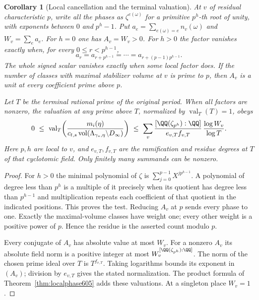 \documentclass[a4paper,11pt]{article}
\newtheorem{corollary}[proposition]{Corollary}
\theoremstyle{definition}
\theoremstyle{remark}
\numberwithin{equation}{section}
\begin{document}
\begin{corollary}[Local cancellation and the terminal valuation]
\leavevmode\label{cor:phasevaluation605}
At \(v\) of residual characteristic \(p\), write all the
phases as \(\zeta^{e(\omega)}\) for a primitive \(p^h\)-th
root of unity, with exponents between \(0\) and \(p^h-1\).
Put \(a_e=\sum_{e(\omega)=e}n_v(\omega)\) and
\(W_v=\sum_e a_e\). For \(h=0\) one has \(A_v=W_v>0\).
For \(h>0\) the factor vanishes exactly when, for every
\(0\le r<p^{h-1}\),
\[
        a_r=a_{r+p^{h-1}}=\cdots=a_{r+(p-1)p^{h-1}} .
\]
The whole signed scalar vanishes exactly when some local
factor does. If the number of classes with maximal stabilizer
volume at \(v\) is prime to \(p\), then \(A_v\) is a unit
at every coefficient prime above \(p\).

Let \(T\) be the terminal rational prime of the original
period. When all factors are nonzero, the valuation at any
prime above \(T\), normalized by \(\operatorname{val}_T(T)=1\),
obeys
\[
 0\ \le\
 \operatorname{val}_T\!\left(
   \frac{m_i(\eta)}
        {c_{t,s}\operatorname{vol}(\Lambda_{\gamma_*,\eta}\backslash D_\infty)}
                         \right)
 \ \le\ \sum_v
   \frac{[\QQ(\zeta_{p^h}):\QQ]}{e_{v,T}f_{v,T}}\,
                       \frac{\log W_v}{\log T}.
\]
Here \(p,h\) are local to \(v\), and \(e_{v,T},f_{v,T}\)
are the ramification and residue degrees at \(T\) of that
cyclotomic field. Only finitely many summands can be nonzero.
\end{corollary}
\begin{proof}
For \(h>0\) the minimal polynomial of \(\zeta\) is
\(\sum_{j=0}^{p-1} X^{jp^{h-1}}\). A polynomial of degree
less than \(p^h\) is a multiple of it precisely when its
quotient has degree less than \(p^{h-1}\) and multiplication
repeats each coefficient of that quotient in the indicated
positions. This proves the test. Reducing \(A_v\) at \(p\)
sends every phase to one. Exactly the maximal-volume classes
have weight one; every other weight is a positive power of
\(p\). Hence the residue is the asserted count modulo \(p\).

Every conjugate of \(A_v\) has absolute value at most \(W_v\).
For a nonzero \(A_v\) its absolute field norm is a positive
integer at most \(W_v^{[\QQ(\zeta_{p^h}):\QQ]}\). The norm
of the chosen prime ideal over \(T\) is \(T^{f_{v,T}}\).
Taking logarithms bounds its exponent in \((A_v)\); division
by \(e_{v,T}\) gives the stated normalization. The product
formula of Theorem~\ref{thm:localphase605} adds these valuations.
At a singleton place \(W_v=1\).
\end{proof}
\end{document}
